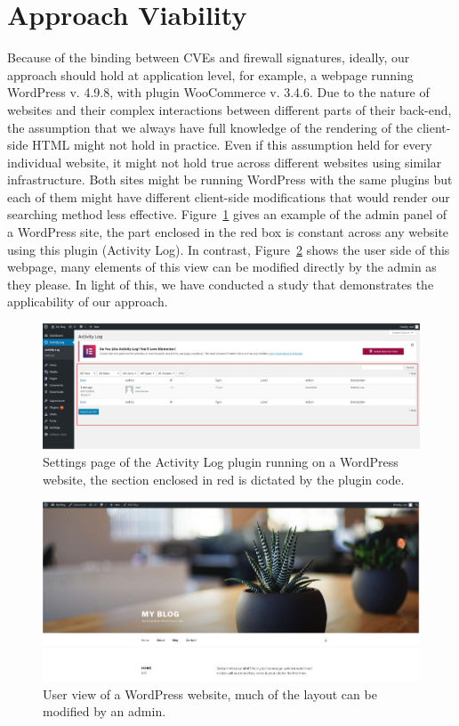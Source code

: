 \section{Approach Viability}

Because of the binding between CVEs and firewall signatures, ideally, our approach should hold at application level, for example, a webpage running WordPress v. 4.9.8, with plugin WooCommerce v. 3.4.6. Due to the nature of websites and their complex interactions between different parts of their back-end, the assumption that we always have full knowledge of the rendering of the client-side HTML might not hold in practice. Even if this assumption held for every individual website, it might not hold true across different websites using similar infrastructure. Both sites might be running WordPress with the same plugins but each of them might have different client-side modifications that would render our searching method less effective. Figure~\ref{fig:admin_view} gives an example of the admin panel of a WordPress site, the part enclosed in the red box is constant across any website using this plugin (Activity Log). In contrast, Figure~\ref{fig:user_view} shows the user side of this webpage, many elements of this view can be modified directly by the admin as they please.  In light of this, we have conducted a study that demonstrates the applicability of our approach.

\begin{figure}[h]
	\includegraphics[scale=0.25]{img/admin_view.JPG}
	\caption{Settings page of the Activity Log plugin running on a WordPress website, the section enclosed in red is dictated by the plugin code.}
	\label{fig:admin_view}
\end{figure}

\begin{figure}[h]
	\includegraphics[scale=0.3]{img/user_view.JPG}
	\caption{User view of a WordPress website, much of the layout can be modified by an admin.}
	\label{fig:user_view}
\end{figure}

